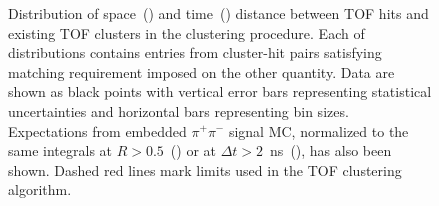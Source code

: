 \begin{figure}[ht!]
{\begin{subfigure}[b]{\linewidth}{
                }
  \end{subfigure}
}\vspace*{-10pt}%
\caption[Distribution of space and time distance between TOF hits and existing TOF clusters.]{Distribution of space~() and time~() distance between TOF hits and existing TOF clusters in the clustering procedure. Each of distributions contains entries from cluster-hit pairs satisfying matching requirement imposed on the other quantity. Data are shown as black points with vertical error bars representing statistical uncertainties and horizontal bars representing bin sizes. Expectations from embedded $\pi^{+}\pi^{-}$ signal MC, normalized to the same integrals at $R>0.5$~() or at $\Delta t>2$~ns~(), has also been shown. Dashed red lines mark limits used in the TOF clustering algorithm.}\label{fig:TofClusterHitDistance}
\end{figure}%



